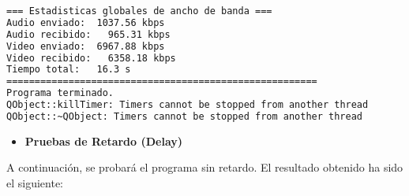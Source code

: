 \begin{adjustbox}{max width=\textwidth}
\begin{lstlisting}[language=bash,basicstyle=\ttfamily\scriptsize]
=== Estadisticas globales de ancho de banda ===
Audio enviado:	1037.56 kbps
Audio recibido:   965.31 kbps
Video enviado:	6967.88 kbps
Video recibido:   6358.18 kbps
Tiempo total: 	16.3 s
=======================================================
Programa terminado.
QObject::killTimer: Timers cannot be stopped from another thread
QObject::~QObject: Timers cannot be stopped from another thread
\end{lstlisting}
\end{adjustbox}
\vspace{\baselineskip}

\newpage

\begin{itemize}
    \item \textbf{Pruebas de Retardo (Delay)}
\end{itemize}

A continuación, se probará el programa sin retardo. El resultado obtenido ha sido el siguiente:
\vspace{\baselineskip}

